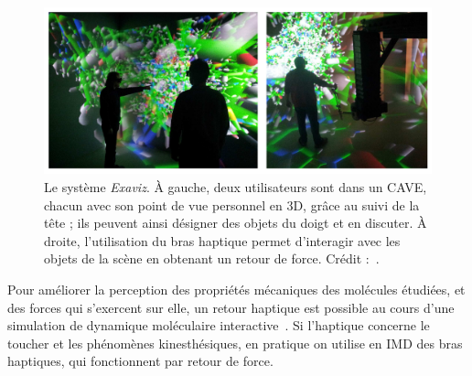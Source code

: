 	\begin{figure}[htb]
		\centering
		\includegraphics[width=\textwidth]{figures/ch1/exaviz}
		\caption[IMD en environnement virtuel avec retour haptique, \emph{Exaviz}.]{Le système \emph{Exaviz}. À gauche, deux utilisateurs sont dans un CAVE\footnotemark, chacun avec son point de vue personnel en 3D, grâce au suivi de la tête ; ils peuvent ainsi désigner des objets du doigt et en discuter. À droite, l'utilisation du bras haptique permet d'interagir avec les objets de la scène en obtenant un retour de force. Crédit :~\cite{dreher2014exaviz}.}
		\label{fig:exaviz}
	\end{figure}
	
	
	Pour améliorer la perception des propriétés mécaniques des molécules étudiées, et des forces qui s'exercent sur elle, un retour haptique est possible au cours d'une simulation de dynamique moléculaire interactive~\cite{stone2001system}. Si l'haptique concerne le toucher et les phénomènes kinesthésiques, en pratique on utilise en IMD des bras haptiques, qui fonctionnent par retour de force.%
	
%	
	
